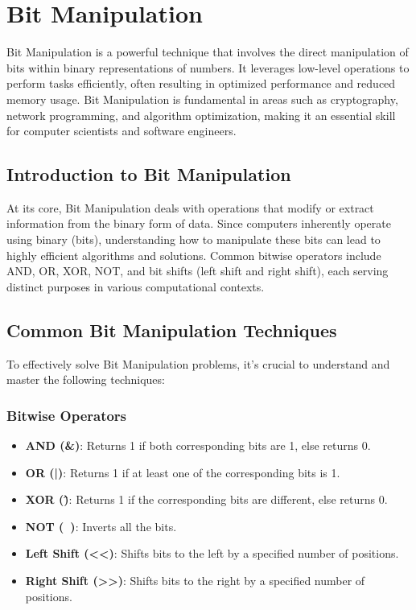 
\chapter{Bit Manipulation}
\label{chapter:bit_manipulation}

Bit Manipulation is a powerful technique that involves the direct manipulation of bits within binary representations of numbers. It leverages low-level operations to perform tasks efficiently, often resulting in optimized performance and reduced memory usage. Bit Manipulation is fundamental in areas such as cryptography, network programming, and algorithm optimization, making it an essential skill for computer scientists and software engineers.

\section*{Introduction to Bit Manipulation}

At its core, Bit Manipulation deals with operations that modify or extract information from the binary form of data. Since computers inherently operate using binary (bits), understanding how to manipulate these bits can lead to highly efficient algorithms and solutions. Common bitwise operators include AND, OR, XOR, NOT, and bit shifts (left shift and right shift), each serving distinct purposes in various computational contexts.

\section*{Common Bit Manipulation Techniques}

To effectively solve Bit Manipulation problems, it's crucial to understand and master the following techniques:

\subsection*{Bitwise Operators}
\begin{itemize}
    \item \textbf{AND (\&)}: Returns 1 if both corresponding bits are 1, else returns 0.
    \item \textbf{OR (|)}: Returns 1 if at least one of the corresponding bits is 1.
    \item \textbf{XOR (\^)}: Returns 1 if the corresponding bits are different, else returns 0.
    \item \textbf{NOT (~)}: Inverts all the bits.
    \item \textbf{Left Shift (<<)}: Shifts bits to the left by a specified number of positions.
    \item \textbf{Right Shift (>>)}: Shifts bits to the right by a specified number of positions.
\end{itemize}

